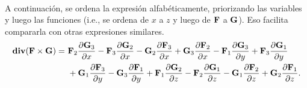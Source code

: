 \documentclass{fmbvecto}
\begin{document}
\begin{problema}
\begin{align*}
\end{align*}
A continuación, se ordena la expresión alfabéticamente, priorizando las variables y luego las funciones (i.e., se ordena de \(x\) a \(z\) y luego de \(\boldsymbol{{\mathbf{F}}}\) a \(\boldsymbol{{\mathbf{G}}}\)). Eso facilita compararla con otras expresiones similares.
\begin{align*}
    \operatorname{\mathbf{div}} (\boldsymbol{{\mathbf{F}}} \times \boldsymbol{{\mathbf{G}}}) = \ & \boldsymbol{{\mathbf{F}}}_2\frac{\partial  \boldsymbol{{\mathbf{G}}}_3}{\partial x} - \boldsymbol{{\mathbf{F}}}_3\frac{\partial \boldsymbol{{\mathbf{G}}}_2}{\partial x} - \boldsymbol{{\mathbf{G}}}_2\frac{\partial \boldsymbol{{\mathbf{F}}}_3 }{\partial x} + \boldsymbol{{\mathbf{G}}}_3\frac{\partial \boldsymbol{{\mathbf{F}}}_2}{\partial x} - \boldsymbol{{\mathbf{F}}}_1\frac{\partial \boldsymbol{{\mathbf{G}}}_3}{\partial y} + \boldsymbol{{\mathbf{F}}}_3\frac{\partial \boldsymbol{{\mathbf{G}}}_1}{\partial y} \\ & + \boldsymbol{{\mathbf{G}}}_1\frac{\partial \boldsymbol{{\mathbf{F}}}_3}{\partial y} - \boldsymbol{{\mathbf{G}}}_3\frac{\partial \boldsymbol{{\mathbf{F}}}_1}{\partial y} + \boldsymbol{{\mathbf{F}}}_1\frac{\partial \boldsymbol{{\mathbf{G}}}_2}{\partial z} - \boldsymbol{{\mathbf{F}}}_2\frac{\partial \boldsymbol{{\mathbf{G}}}_1}{\partial z} - \boldsymbol{{\mathbf{G}}}_1\frac{\partial \boldsymbol{{\mathbf{F}}}_2}{\partial z} + \boldsymbol{{\mathbf{G}}}_2 \frac{\partial \boldsymbol{{\mathbf{F}}}_1}{\partial z}   .
\end{align*}


\end{problema}
\end{document}
